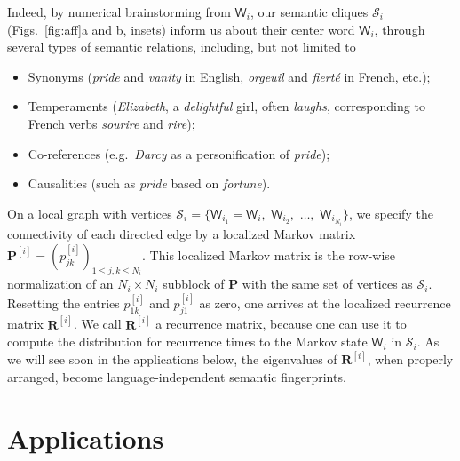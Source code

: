 \documentclass[10pt,journal,compsoc]{IEEEtran}
\newcommand{\textlat}{}
\begin{document}
 Indeed, by numerical brainstorming from $ \mathsf W_i$, our  semantic cliques $  \mathscr S_i$ (Figs.~\ref{fig:aff}a and b, insets)  inform us about their center word $ \mathsf W_i$, through several types of semantic relations, including, but  not limited to \begin{itemize}
\item
Synonyms (\textit{pride} and \textit{vanity} in English, \textit{orgeuil} and \textit{fiert\'e} in French, etc.);\item Temperaments (\textit{Elizabeth}, a  \textit{delightful} girl, often \textit{laughs}, corresponding to French verbs \textit{sourire} and \textit{rire});\item Co-references (\textlat{e.g.}~\textit{Darcy} as a personification of \textit{pride});\item Causalities (such as \textit{pride} based on \textit{fortune}).
\end{itemize}

On a local graph with vertices  $ \mathscr S_i=\{\mathsf W_{i_1}=\mathsf W_i,$ $\mathsf W_{i_2},$ $\dots,$ $\mathsf W_{i_{N_i}}\}$,   we specify the connectivity of each directed edge by a localized  Markov  matrix $ \mathbf{ P}^{[i]}=( p_{jk}^{[i]})_{1\leq j,k\leq N_i}$. This localized Markov matrix
 is the  row-wise normalization of  an $  N_{i}\times N_{i}$ subblock of  $ \mathbf{ P}$ with the same set of vertices as $ \mathscr S_i$.  Resetting the entries $  p_{1k}^{[i]}$ and $  p^{[i]}_{j1}$ as zero, one arrives at the localized recurrence matrix $ \mathbf{ R}^{[i]}$. We call   $ \mathbf{ R}^{[i]}$ a recurrence matrix, because one can use it to  compute  the distribution for
recurrence times to the Markov state
$ \mathsf W_i$ in $ \mathscr S_i$. As we will see soon in the applications below, the eigenvalues of    $ \mathbf{ R}^{[i]}$, when properly arranged, become language-independent semantic fingerprints.





\section{Applications}
\end{document}
